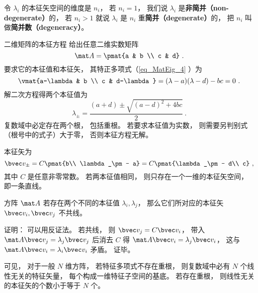 令 $\lambda_i$ 的本征矢空间的维度是 $n_i$， 若 $n_i = 1$， 我们说 $\lambda_i$ 是\textbf{非简并（non-degenerate）}的， 若 $n_i > 1$ 就说 $\lambda_i$ 是 $n_i$ 重\textbf{简并（degenerate）}的， 把 $n_i$ 叫做\textbf{简并数（degeneracy）}。

\begin{example}{二维矩阵的本征方程}
给出任意二维实数矩阵
\begin{equation}
\mat A = \pmat{a & b \\ c & d}~.
\end{equation}
要求它的本征值和本征矢， 其特正多项式（\autoref{eq_MatEig_4} ）为
\begin{equation}
\vmat{a-\lambda & b \\ c & d-\lambda} = (\lambda-a)(\lambda-d) - bc = 0~.
\end{equation}
解二次方程得两个本征值为
\begin{equation}
\lambda_\pm = \frac{(a + d) \pm \sqrt{(a-d)^2 + 4bc}}{2}~.
\end{equation}
复数域中必定存在两个根， 包括重根。 若要求本征值为实数， 则需要另判别式（根号中的式子）大于零， 否则本征方程无解。

本征矢为
\begin{equation}
\bvec v_\pm = C\pmat{b\\ \lambda_\pm - a} = C\pmat{\lambda_\pm - d\\ c}~,
\end{equation}
其中 $C$ 是任意非零常数。 若两本征值相同， 则只存在一个一维的本征矢空间， 即一条直线。
\end{example}

\begin{theorem}{}
方阵 $\mat A$ 若存在两个不同的本征值 $\lambda_i, \lambda_j$， 那么它们所对应的本征矢 $\bvec v_i, \bvec v_j$ 不共线。
\end{theorem}
证明： 可以用反证法。 若共线， 则 $\bvec v_j = C \bvec v_i$， 带入 $\mat A \bvec v_j = \lambda_j \bvec v_j$ 后消去 $C$ 得 $\mat A \bvec v_i = \lambda_j \bvec v_i$， 这与 $\mat A \bvec v_i = \lambda_i \bvec v_i$ 矛盾。 证毕。

可见， 对于一般 $N$ 维方阵， 若特征多项式不存在重根， 则复数域中必有 $N$ 个线性无关的特征矢量， 每个构成一维特征子空间的基底。 若存在重根， 则线性无关的本征矢的个数小于等于 $N$ 个。

